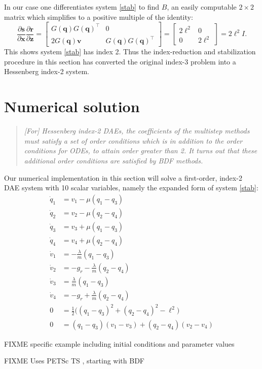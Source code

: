 \documentclass[letterpaper,final,12pt,reqno]{amsart}
\newcommand{\bq}{\mathbf{q}}
\newcommand{\br}{\mathbf{r}}
\newcommand{\bs}{\mathbf{s}}
\newcommand{\bv}{\mathbf{v}}
\newcommand{\bx}{\mathbf{x}}
\newcommand{\bz}{\mathbf{z}}
\begin{document}
In our case one differentiates system \eqref{stab} to find $B$, an easily computable $2\times 2$ matrix which simplifies to a positive multiple of the identity:
\begin{equation}
\frac{\partial \bs}{\partial \bx} \frac{\partial \br}{\partial \bz} = \begin{bmatrix}  G(\bq) G(\bq)^\top & 0 \\ 2 G(\bq) \bv & G(\bq) G(\bq)^\top \end{bmatrix} = \begin{bmatrix}  2\ell^2 & 0 \\ 0 & 2\ell^2 \end{bmatrix} = 2\ell^2 I.
\end{equation}
This shows system \eqref{stab} has index 2.  Thus the index-reduction and stabilization procedure in this section has converted the original index-3 problem into a Hessenberg index-2 system.


\section{Numerical solution}

\begin{quote}
\emph{[For] Hessenberg index-2 DAEs, the coefficients of the multistep methods must satisfy a set of order conditions which is in addition to the order conditions for ODEs, to attain order greater than 2.  It turns out that these additional order conditions are satisfied by BDF methods.} \, \cite[p 267]{AscherPetzold1998}
\end{quote}

Our numerical implementation in this section will solve a first-order, index-2 DAE system with 10 scalar variables, namely the expanded form of system \eqref{stab}:
\begin{subequations}
\label{rawstab}
\begin{align}
\dot q_1 &= v_1 - \mu (q_1 - q_3) \\
\dot q_2 &= v_2 - \mu (q_2 - q_4) \\
\dot q_3 &= v_3 + \mu (q_1 - q_3) \\
\dot q_4 &= v_4 + \mu (q_2 - q_4) \\
\dot v_1 &= - \frac{\lambda}{m} (q_1 - q_3) \\
\dot v_2 &= - g_r - \frac{\lambda}{m} (q_2 - q_4) \\
\dot v_3 &= \frac{\lambda}{m} (q_1 - q_3) \\
\dot v_4 &= - g_r + \frac{\lambda}{m} (q_2 - q_4) \\
       0 &= \frac{1}{2} \Big((q_1 - q_3)^2 + (q_2 - q_4)^2 - \ell^2\Big) \\
       0 &= (q_1 - q_3)(v_1 - v_3) + (q_2 - q_4) (v_2 - v_4)
\end{align}
\end{subequations}

FIXME specific example including initial conditions and parameter values

FIXME Uses PETSc TS \cite{Balayetal2021,Bueler2021}, starting with BDF

\small

\bigskip


\end{document}
